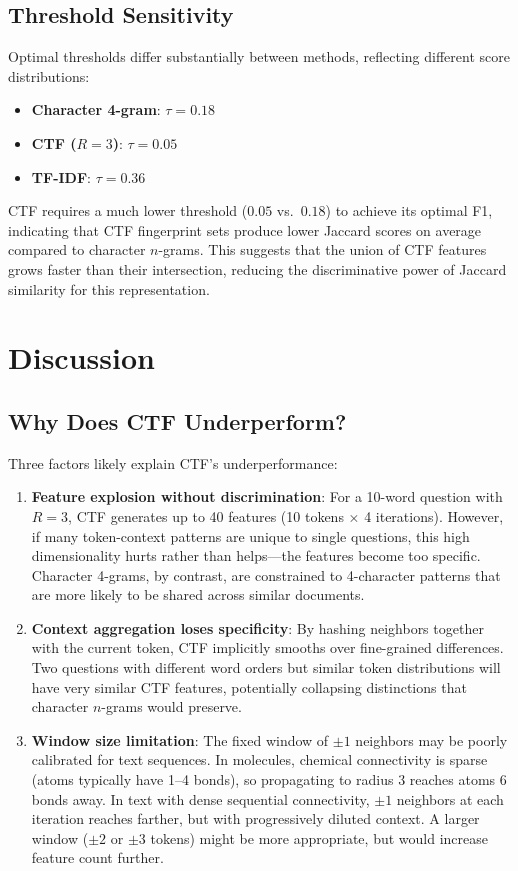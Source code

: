 \documentclass[11pt,letterpaper]{article}
\begin{document}
\subsection{Threshold Sensitivity}

Optimal thresholds differ substantially between methods, reflecting different score distributions:
\begin{itemize}
  \item \textbf{Character 4-gram}: $\tau=0.18$
  \item \textbf{CTF ($R=3$)}: $\tau=0.05$
  \item \textbf{TF-IDF}: $\tau=0.36$
\end{itemize}

CTF requires a much lower threshold ($0.05$ vs.\ $0.18$) to achieve its optimal F1, indicating that CTF fingerprint sets produce lower Jaccard scores on average compared to character $n$-grams. This suggests that the union of CTF features grows faster than their intersection, reducing the discriminative power of Jaccard similarity for this representation.

\section{Discussion}

\subsection{Why Does CTF Underperform?}

Three factors likely explain CTF's underperformance:

\begin{enumerate}
  \item \textbf{Feature explosion without discrimination}: For a 10-word question with $R=3$, CTF generates up to 40 features (10 tokens $\times$ 4 iterations). However, if many token-context patterns are unique to single questions, this high dimensionality hurts rather than helps---the features become too specific. Character 4-grams, by contrast, are constrained to 4-character patterns that are more likely to be shared across similar documents.

  \item \textbf{Context aggregation loses specificity}: By hashing neighbors together with the current token, CTF implicitly smooths over fine-grained differences. Two questions with different word orders but similar token distributions will have very similar CTF features, potentially collapsing distinctions that character $n$-grams would preserve.

  \item \textbf{Window size limitation}: The fixed window of $\pm1$ neighbors may be poorly calibrated for text sequences. In molecules, chemical connectivity is sparse (atoms typically have 1--4 bonds), so propagating to radius 3 reaches atoms 6 bonds away. In text with dense sequential connectivity, $\pm1$ neighbors at each iteration reaches farther, but with progressively diluted context. A larger window ($\pm2$ or $\pm3$ tokens) might be more appropriate, but would increase feature count further.
\end{enumerate}
\end{document}
